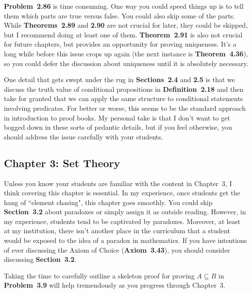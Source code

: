 \documentclass[11pt]{article}%
\newcommand{\blankline}{\pagebreak[2]\vspace{.5\baselineskip}}
\begin{document}
\blankline

\textbf{Problem~2.86} is time consuming.  One way you could speed things up is to tell them which parts are true versus false.  You could also skip some of the parts.  While \textbf{Theorems~2.89} and \textbf{2.90} are not crucial for later, they could be skipped, but I recommend doing at least one of them.  \textbf{Theorem~2.91} is also not crucial for future chapters, but provides an opportunity for proving uniqueness.  It's a long while before this issue crops up again (the next instance is \textbf{Theorem~4.36}), so you could defer the discussion about uniqueness until it is absolutely necessary. 

\blankline

One detail that gets swept under the rug in \textbf{Sections~2.4} and \textbf{2.5} is that we discuss the truth value of conditional propositions in \textbf{Definition~2.18} and then take for granted that we can apply the same structure to conditional statements involving predicates. For better or worse, this seems to be the standard approach in introduction to proof books.  My personal take is that I don't want to get bogged down in these sorts of pedantic details, but if you feel otherwise, you should address the issue carefully with your students.


\subsection*{Chapter 3: Set Theory}

Unless you know your students are familiar with the content in Chapter~3, I think covering this chapter is essential.  In my experience, once students get the hang of ``element chasing", this chapter goes smoothly.  You could skip \textbf{Section~3.2} about paradoxes or simply assign it as outside reading.  However, in my experience, students tend to be captivated by paradoxes.  Moreover, at least at my institution, there isn't another place in the curriculum that a student would be exposed to the idea of a paradox in mathematics.  If you have intentions of ever discussing the Axiom of Choice (\textbf{Axiom~3.43}), you should consider discussing \textbf{Section~3.2}.

\blankline

Taking the time to carefully outline a skeleton proof for proving $A\subseteq B$ in \textbf{Problem~3.9} will help tremendously as you progress through Chapter~3. 

\blankline
\end{document}
